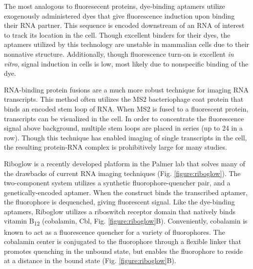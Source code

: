 The most analogous to fluoresecent proteins, dye-binding aptamers utilize exogenously administered dyes that give fluorescence induction upon binding their RNA partner.\cite{PaigeRNAMimicsGreen2011,FilonovBroccoliRapidSelection2014,AutourFluorogenicRNAMango2018,DolgosheinaRNAMangoAptamerFluorophore2014} This sequence is encoded downstream of an RNA of interest to track its location in the cell. Though excellent binders for their dyes, the aptamers utilized by this technology are unstable in mammalian cells due to their nonnative structure.\cite{EtzelSyntheticRiboswitchesPlug2017} Additionally, though fluorescence turn-on is excellent \textit{in vitro}, signal induction in cells is low, most likely due to nonspecific binding of the dye.

RNA-binding protein fusions are a much more robust technique for imaging RNA transcripts.\cite{FuscoSinglemRNAMolecules2003} This method often utilizes the MS2 bacteriophage coat protein that binds an encoded stem loop of RNA. When MS2 is fused to a fluorescent protein, transcripts can be visualized in the cell. In order to concentrate the fluorescence signal above background, multiple stem loops are placed in series (up to 24 in a row). Though this technique has enabled imaging of single transcripts in the cell,\cite{MorisakiRealtimequantificationsingle2016,FuscoSinglemRNAMolecules2003} the resulting protein-RNA complex is prohibitively large for many studies.


Riboglow is a recently developed platform in the Palmer lab that solves many of the drawbacks of current RNA imaging techniques (Fig. \ref{figure:riboglow}).\cite{BraselmannDevelopmentriboswitchbasedplatform2017} The two-component system utilizes a synthetic fluorophore-quencher pair, and a genetically-encoded aptamer. When the construct binds the transcribed aptamer, the fluorophore is dequenched, giving fluorescent signal. Like the dye-binding aptamers, Riboglow utilizes a riboswitch receptor domain that natively binds vitamin B\textsubscript{12} (cobalamin, Cbl, Fig. \ref{figure:riboglow}B).\cite{JohnsonJrB12cofactorsdirectly2012} Conveniently, cobalamin is known to act as a fluorescence quencher for a variety of fluorophores.\cite{RosendahlSynthesisbiologicalactivity1982,LeeDesignSynthesisCharacterization2009,SmeltzerSynthesisCharacterizationFluorescent2001} The cobalamin center is conjugated to the fluorophore through a flexible linker that promotes quenching in the unbound state, but enables the fluorophore to reside at a distance in the bound state (Fig. \ref{figure:riboglow}B).

